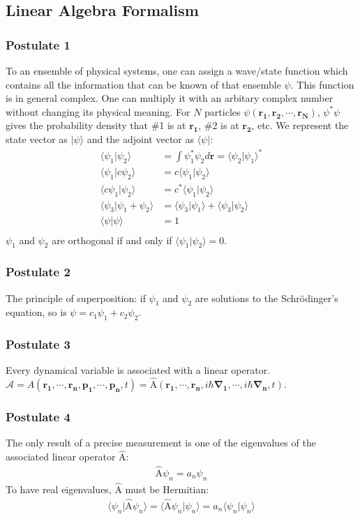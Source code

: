 \documentclass[11pt, letterpaper]{article}
\newcommand{\ve}[1]{
  \ensuremath{\bm{#1}}}	               %
\newcommand{\cc}[1]{
  \ensuremath{#1^{\ast}}}              %
\newcommand{\operator}[1]{
  \ensuremath{\hat{\text{#1}}}}        %
\newcommand{\bra}[1]{
  \ensuremath{\langle #1 |}}           %
\newcommand{\ket}[1]{
  \ensuremath{| #1 \rangle }}          %
\newcommand{\braket}[2]{
  \ensuremath{\langle #1|#2 \rangle }} %
\begin{document}
\begin{multicols*}{3}
\subsection{Linear Algebra Formalism}
\subsubsection{Postulate 1}
To an ensemble of physical systems, one can assign a wave/state function which contains all the information that can be known of that ensemble $\psi$. This function is in general complex. One can multiply it with an arbitary complex number without changing its physical meaning. For $N$ particles $\psi(\ve{r_1}, \ve{r_2}, \cdots, \ve{r_N})$, $\cc{\psi} \psi$ gives the probability density that \#1 is at $\ve{r_1}$, \#2 is at $\ve{r_2}$, etc. We represent the state vector as $\ket{\psi}$ and the adjoint vector as $\bra{\psi}$:
\begin{align*}
  \braket{\psi_1}{\psi_2} &= \int \cc{\psi_1} \psi_2 d\ve{r} = \cc{\braket{\psi_2}{\psi_1}}\\
  \braket{\psi_1}{c\psi_2} &= c \braket{\psi_1}{\psi_2} \\
  \braket{c\psi_1}{\psi_2} &= \cc{c} \braket{\psi_1}{\psi_2} \\
  \braket{\psi_3}{\psi_1 + \psi_2} &= \braket{\psi_3}{\psi_1} + \braket{\psi_3}{\psi_2} \\
  \braket{\psi}{\psi} &= 1\\
\end{align*}
$\psi_1$ and $\psi_2$ are orthogonal if and only if $\braket{\psi_1}{\psi_2} = 0$.

\subsubsection{Postulate 2}
The principle of superposition: if $\psi_1$ and $\psi_2$ are solutions to the Schr\"{o}dinger's equation, so is $\psi = c_1 \psi_1 + c_2 \psi_2$.

\subsubsection{Postulate 3}
Every dynamical variable is associated with a linear operator. $\mathcal{A} = A(\ve{r_1}, \cdots, \ve{r_n}, \ve{p_1}, \cdots, \ve{p_n}, t) = \operator{A}(\ve{r_1}, \cdots, \ve{r_n}, i\hbar \ve{\nabla_1}, \cdots, i\hbar \ve{\nabla_n}, t)$.

\subsubsection{Postulate 4}
The only result of a precise measurement is one of the eigenvalues of the associated linear operator $\operator{A}$:
\begin{align*}
  \operator{A} \psi_n = a_n \psi_n
\end{align*}
To have real eigenvalues, $\operator{A}$ must be Hermitian:
\begin{align*}
  \braket{\psi_n}{\operator{A} \psi_n} = \braket{\operator{A} \psi_n}{\psi_n} = a_n\braket{\psi_n}{\psi_n}
\end{align*}


\end{multicols*}
\end{document}
